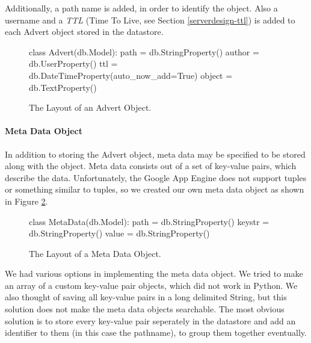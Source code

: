 Additionally, a path name is added, in order to identify the object. Also a
username and a \emph{TTL} (Time To Live, see Section \ref{serverdesign-ttl}) is
added to each Advert object stored in the datastore.

\begin{figure}[ht] %
\begin{center}
\begin{code}
class Advert(db.Model):
  path   = db.StringProperty()
  author = db.UserProperty()
  ttl    = db.DateTimeProperty(auto_now_add=True)
  object = db.TextProperty() 
\end{code}
\caption{The Layout of an Advert Object.\label{serverdesign-advert-obj}}
\end{center}
\end{figure}

\paragraph{Meta Data Object}
In addition to storing the Advert object, meta data may be specified to be
stored along with the object. Meta data consists out of a set of key-value
pairs, which describe the data. Unfortunately, the Google App Engine does not
support tuples or something similar to tuples, so we created our own meta data
object as shown in Figure \ref{serverdesign-metadata-obj}.

\begin{figure}[ht] %
\begin{center}
\begin{code}
class MetaData(db.Model):
  path   = db.StringProperty()
  keystr = db.StringProperty()
  value  = db.StringProperty()
\end{code}
\caption{The Layout of a Meta Data Object.\label{serverdesign-metadata-obj}}
\end{center}
\end{figure}

We had various options in implementing the meta data object. We tried to make
an array of a custom key-value pair objects, which did not work in Python. We
also thought of saving all key-value pairs in a long delimited String, but this
solution does not make the meta data objects searchable. The most obvious
solution is to store every key-value pair seperately in the datastore and add
an identifier to them (in this case the pathname), to group them together
eventually.
 
